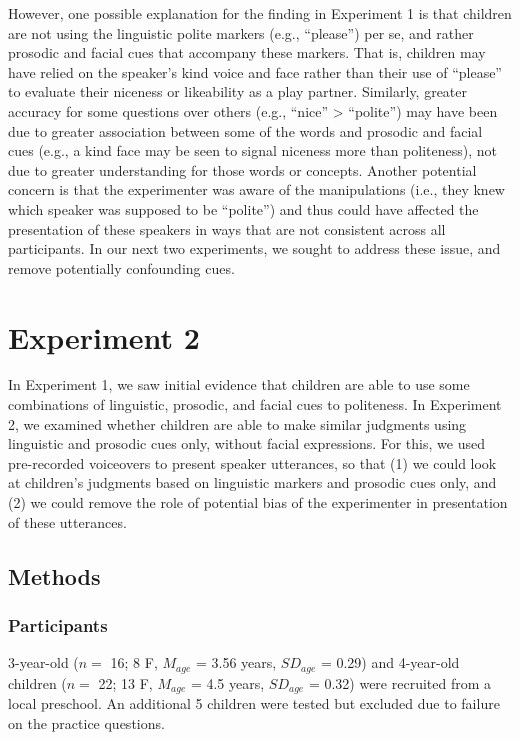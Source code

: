 \documentclass[10pt, letterpaper]{article}
\begin{document}
However, one possible explanation for the finding in Experiment 1 is
that children are not using the linguistic polite markers (e.g.,
``please'') per se, and rather prosodic and facial cues that accompany
these markers. That is, children may have relied on the speaker's kind
voice and face rather than their use of ``please'' to evaluate their
niceness or likeability as a play partner. Similarly, greater accuracy
for some questions over others (e.g., ``nice'' \textgreater{}
``polite'') may have been due to greater association between some of the
words and prosodic and facial cues (e.g., a kind face may be seen to
signal niceness more than politeness), not due to greater understanding
for those words or concepts. Another potential concern is that the
experimenter was aware of the manipulations (i.e., they knew which
speaker was supposed to be ``polite'') and thus could have affected the
presentation of these speakers in ways that are not consistent across
all participants. In our next two experiments, we sought to address
these issue, and remove potentially confounding cues.

\section{Experiment 2}\label{experiment-2}

In Experiment 1, we saw initial evidence that children are able to use
some combinations of linguistic, prosodic, and facial cues to
politeness. In Experiment 2, we examined whether children are able to
make similar judgments using linguistic and prosodic cues only, without
facial expressions. For this, we used pre-recorded voiceovers to present
speaker utterances, so that (1) we could look at children's judgments
based on linguistic markers and prosodic cues only, and (2) we could
remove the role of potential bias of the experimenter in presentation of
these utterances.

\subsection{Methods}\label{methods-1}

\subsubsection{Participants}\label{participants-1}

3-year-old (\(n=\) 16; 8 F, \(M_{age}\) = 3.56 years, \(SD_{age}\) =
0.29) and 4-year-old children (\(n=\) 22; 13 F, \(M_{age}\) = 4.5 years,
\(SD_{age}\) = 0.32) were recruited from a local preschool. An
additional 5 children were tested but excluded due to failure on the
practice questions.
\end{document}
